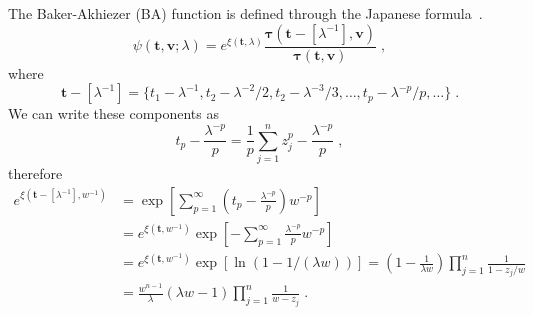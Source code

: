 \documentclass[a4paper,11pt]{amsart}
\begin{document}
The Baker-Akhiezer (BA) function is defined through the
Japanese formula~\cite{Babelon:2003qtg, Harnad:2021tau, Zabrodin2018}.
\begin{equation}
\label{eq:ba-function}
  \psi(\bm{t},\bm{v}; \lambda) = e^{\xi(\bm{t}, \lambda)}
  \frac{\bm{\tau}(\bm{t} - [\lambda^{-1}], \bm{v})}{\bm{\tau}(\bm{t}, \bm{v})}\; ,
\end{equation}
where 
\begin{equation}
  \bm{t} - [\lambda^{-1}] = 
  \{t_1 - \lambda^{-1}, t_2 - \lambda^{-2}/ 2 ,  t_2 - \lambda^{-3}/3, \dots,  t_p - \lambda^{-p}/p, \dots \}\; .
\end{equation}
We can write these components as
\begin{equation}
  t_p - \frac{\lambda^{-p}}{p} = \frac{1}{p} \sum_{j=1}^n z_j^ p - \frac{\lambda^{-p}}{p} \; , 
\end{equation}
therefore
\begin{equation}
  \begin{split}
    e^{\xi(\bm{t} - [\lambda^{-1}], w^{-1})} & = \exp\left[ \sum_{p=1}^\infty \left(t_p  - \frac{\lambda^{-p}}{p}\right) w^{-p} \right]\\
    & = e^{\xi(\bm{t}, w^{-1})} \exp\left[ - \sum_{p=1}^\infty \frac{\lambda^{-p}}{p} w^{-p} \right] \\
    & = e^{\xi(\bm{t}, w^{-1})} \exp\left[ \ln ( 1 - 1 / (\lambda w)) \right]
      = \left( 1 - \frac{1}{\lambda w}\right)  \prod_{j=1}^n \frac{1}{1 -  z_j /w} \\
    & = \frac{w^{n-1}}{\lambda } \left( \lambda w - 1 \right)  \prod_{j=1}^n \frac{1}{w -  z_j} \; .
  \end{split}
\end{equation}
\end{document}

